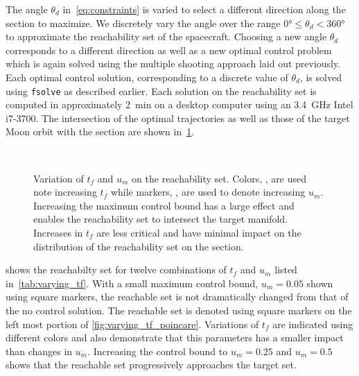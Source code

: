 \documentclass[smallcondensed]{svjour3}
\begin{document}
The angle \( \theta_d\) in~\cref{eq:constraints} is varied to select a different direction along the \Poincare section to maximize.
We discretely vary the angle over the range \( \ang{0} \leq \theta_d < \ang{360} \) to approximate the reachability set of the spacecraft.
Choosing a new angle \( \theta_d \) corresponds to a different direction as well as a new optimal control problem which is again solved using the multiple shooting approach laid out previously.
Each optimal control solution, corresponding to a discrete value of \( \theta_d \), is solved using \texttt{fsolve} as described earlier. 
Each solution on the reachability set is computed in approximately \SI{2}{\minute} on a desktop computer using an \SI{3.4}{\giga\hertz} Intel i7-3700.
The intersection of the optimal trajectories as well as those of the target Moon orbit with the \Poincare section are shown in~\cref{fig:varying_tf_reachability_sets}.

\begin{figure}
    ~
    \caption{Variation of \( t_f \) and \( u_m\) on the reachability set. 
        Colors, , are used note increasing \( t_f\) while markers, , are used to denote increasing \(u_m\).
    Increasing the maximum control bound has a large effect and enables the reachability set to intersect the target manifold. 
    Increases in \(t_f\) are less critical and have minimal impact on the distribution of the reachability set on the \Poincare section.~\label{fig:varying_tf_reachability_sets}}
\end{figure}

 shows the reachabilty set for twelve combinations of \(t_f\) and \( u_m\) listed in~\cref{tab:varying_tf}.
With a small maximum control bound, \( u_m = \num{0.05} \) shown using square markers, the reachable set is not dramatically changed from that of the no control solution.
The reachable set is denoted using square markers on the left most portion of \cref{fig:varying_tf_poincare}.
Variations of \( t_f\) are indicated using different colors and also demonstrate that this parameters has a smaller impact than changes in \( u_m \).
Increasing the control bound to \( u_m = \num{0.25} \) and \( u_m = \num{0.5} \) shows that the reachable set progressively approaches the target set.
\end{document}
